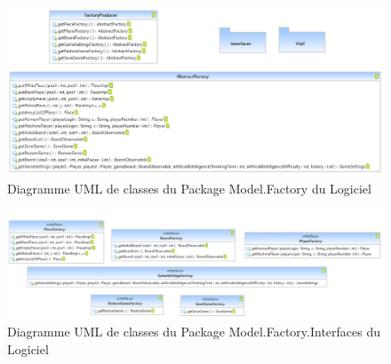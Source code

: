 \documentclass[a4paper,12pt]{report}
\begin{document}
\label{OthKerModelFactory}
\begin{figure}[H]
\centering
 \includegraphics[scale=0.58]{Kernel/Pack_com_model_factory.png}
\caption{Diagramme UML de classes du Package Model.Factory du Logiciel}
\end{figure}

\label{OthKerModelFactoryInterfaces}
\begin{figure}[H]
\centering
\includegraphics[scale=0.45]{Kernel/Pack_com_model_factory_interfaces.png}
\caption{Diagramme UML de classes du Package Model.Factory.Interfaces du Logiciel}
\end{figure}
\end{document}
